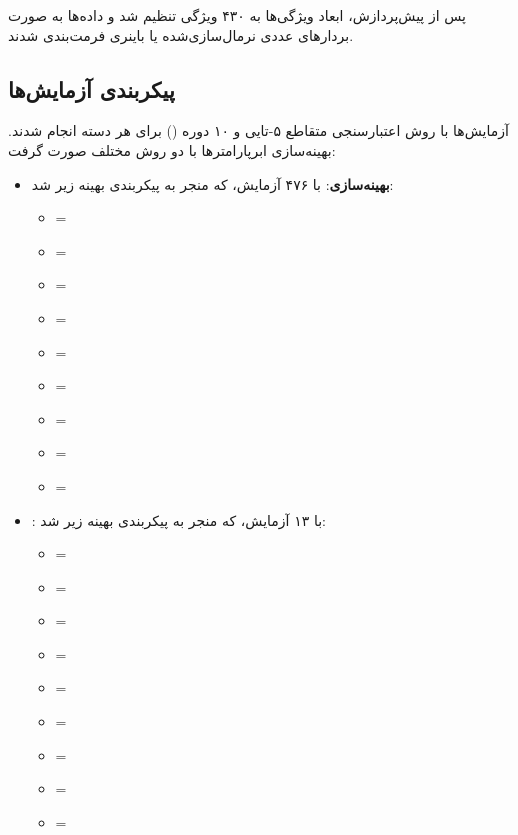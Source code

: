پس از پیش‌پردازش، ابعاد ویژگی‌ها به ۴۳۰ ویژگی تنظیم شد و داده‌ها به صورت بردارهای عددی نرمال‌سازی‌شده یا باینری فرمت‌بندی شدند.

\subsection{پیکربندی آزمایش‌ها}
آزمایش‌ها با روش اعتبارسنجی متقاطع ۵-تایی و ۱۰ دوره () برای هر دسته انجام شدند. بهینه‌سازی ابرپارامترها با دو روش مختلف صورت گرفت:

\begin{itemize}
    \renewcommand{\labelitemi}{\lr{$\bullet$}}
    \item \textbf{بهینه‌سازی}: با ۴۷۶ آزمایش، که منجر به پیکربندی بهینه زیر شد:
    \begin{itemize}
        \renewcommand{\labelitemii}{\lr{$\bullet$}}
        \item {} = 
        \item {} = 
        \item {} = 
        \item {} = 
        \item {} = 
        \item {} = 
        \item {} = 
        \item {} = 
        \item {} = 
    \end{itemize}
    
    \item \textbf{}: با ۱۳ آزمایش، که منجر به پیکربندی بهینه زیر شد:
    \begin{itemize}
        \renewcommand{\labelitemii}{\lr{$\bullet$}}
        \item {} = 
        \item {} = 
        \item {} = 
        \item {} = 
        \item {} = 
        \item {} = 
        \item {} = 
        \item {} = 
        \item {} = 
    \end{itemize}
\end{itemize}

